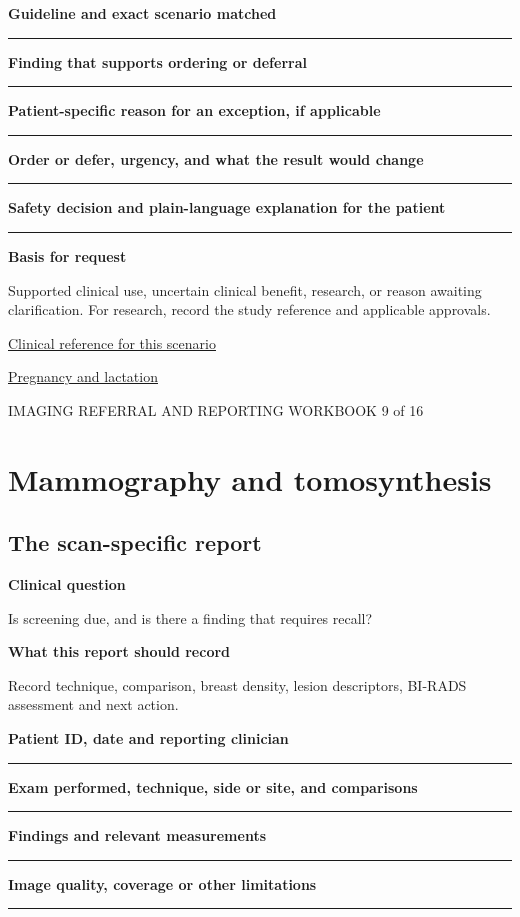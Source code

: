 \documentclass[11pt,a4paper]{article}
\newcommand{\record}[1]{\textbf{#1}\par\vspace{0.55\baselineskip}\hrule\vspace{0.35\baselineskip}}
\begin{document}
\record{Guideline and exact scenario matched}

\record{Finding that supports ordering or deferral}

\record{Patient-specific reason for an exception, if applicable}

\record{Order or defer, urgency, and what the result would change}

\record{Safety decision and plain-language explanation for the patient}

\textbf{Basis for request}\par Supported clinical use, uncertain clinical benefit, research, or reason awaiting clarification. For research, record the study reference and applicable approvals.\par

\small\href{https://www.uspreventiveservicestaskforce.org/uspstf/recommendation/breast-cancer-screening}{Clinical reference for this scenario}

\quad\href{https://pubmed.ncbi.nlm.nih.gov/28937575/}{Pregnancy and lactation}

\normalsize

\newpage

{\small IMAGING REFERRAL AND REPORTING WORKBOOK \hfill 9 of 16}

\section*{Mammography and tomosynthesis}

\subsection*{The scan-specific report}

\textbf{Clinical question}\par Is screening due, and is there a finding that requires recall?\par

\textbf{What this report should record}\par Record technique, comparison, breast density, lesion descriptors, BI-RADS assessment and next action.\par

\record{Patient ID, date and reporting clinician}

\record{Exam performed, technique, side or site, and comparisons}

\record{Findings and relevant measurements}

\record{Image quality, coverage or other limitations}
\end{document}
